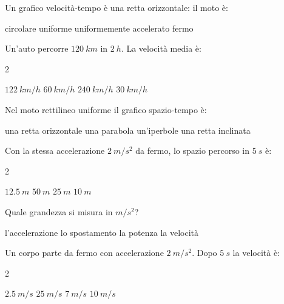 \documentclass[a4paper,10pt]{exam}
\begin{document}
\vspace{2mm}
\begin{questions}
\question Un grafico velocità-tempo è una retta orizzontale: il moto è:
\vspace{0.2em}
\begin{choices}
\choice circolare
\choice uniforme
\choice uniformemente accelerato
\choice fermo
\end{choices}

\question Un'auto percorre $\SI{120}{km}$ in $\SI{2}{h}$. La velocità media è:
\vspace{0.2em}
\begin{multicols}{2}
\begin{choices}
\choice $\SI{122}{km/h}$
\choice $\SI{60}{km/h}$
\choice $\SI{240}{km/h}$
\choice $\SI{30}{km/h}$
\end{choices}
\end{multicols}

\question Nel moto rettilineo uniforme il grafico spazio-tempo è:
\vspace{0.2em}
\begin{choices}
\choice una retta orizzontale
\choice una parabola
\choice un'iperbole
\choice una retta inclinata
\end{choices}

\question Con la stessa accelerazione $\SI{2}{m/s^2}$ da fermo, lo spazio percorso in $\SI{5}{s}$ è:
\vspace{0.2em}
\begin{multicols}{2}
\begin{choices}
\choice $\SI{12.5}{m}$
\choice $\SI{50}{m}$
\choice $\SI{25}{m}$
\choice $\SI{10}{m}$
\end{choices}
\end{multicols}

\question Quale grandezza si misura in $\si{m/s^2}$?
\vspace{0.2em}
\begin{choices}
\choice l'accelerazione
\choice lo spostamento
\choice la potenza
\choice la velocità
\end{choices}

\question Un corpo parte da fermo con accelerazione $\SI{2}{m/s^2}$. Dopo $\SI{5}{s}$ la velocità è:
\vspace{0.2em}
\begin{multicols}{2}
\begin{choices}
\choice $\SI{2.5}{m/s}$
\choice $\SI{25}{m/s}$
\choice $\SI{7}{m/s}$
\choice $\SI{10}{m/s}$
\end{choices}
\end{multicols}

\end{questions}
\end{document}
